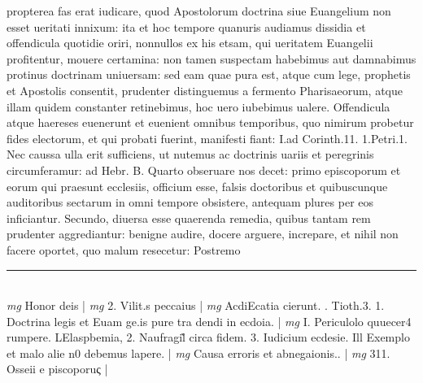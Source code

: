 \documentclass{article}
\begin{document}
\begin{pages}
propterea fas erat iudicare, quod Apostolorum doctrina siue Euangelium non esset ueritati innixum: ita et hoc tempore quanuris audiamus dissidia et offendicula quotidie oriri, nonnullos ex his etsam, qui ueritatem Euangelii profitentur, mouere certamina: non tamen suspectam habebimus aut damnabimus protinus doctrinam uniuersam: sed eam quae pura est, atque cum lege, prophetis et Apostolis consentit, prudenter distinguemus a fermento Pharisaeorum, atque illam quidem constanter retinebimus, hoc uero iubebimus ualere. Offendicula atque  haereses euenerunt et euenient omnibus  temporibus, quo nimirum probetur fides electorum, et qui probati fuerint, manifesti fiant: I.ad Corinth.11. 1.Petri.1. Nec caussa ulla erit sufficiens, ut nutemus ac doctrinis uariis et peregrinis circumferamur: ad Hebr. B. Quarto obseruare nos decet: primo episcoporum et eorum qui praesunt ecclesiis, officium esse, falsis doctoribus et quibuscunque  auditoribus sectarum in omni tempore obsistere, antequam plures per eos inficiantur. Secundo, diuersa esse quaerenda remedia, quibus tantam rem prudenter aggrediantur: benigne audire, docere arguere, increpare, et nihil non facere oportet, quo malum resecetur: Postremo  \pend
\vspace{0.5cm}\noindent
\vspace{0.2cm}\rule{1cm}{0.2pt}\\ 
\hspace{0.2cm}\textit{mg}
\footnotesize Honor deis 
\normalsize| 
\hspace{0.2cm}\textit{mg}
\footnotesize 2. Vilit.s peccaius 
\normalsize| 
\hspace{0.2cm}\textit{mg}
\footnotesize AcdiEcatia cierunt. . Tioth.3. 1. Doctrina legis et Euam ge.is pure tra dendi in ecdoia. 
\normalsize| 
\hspace{0.2cm}\textit{mg}
\footnotesize I. Periculolo quuecer4 rumpere. LElaspbemia, 2. Naufragil̃ circa fidem. 3. Iudicium ecdesie. Ill Exemplo et malo alie n0 debemus lapere. 
\normalsize| 
\hspace{0.2cm}\textit{mg}
\footnotesize Causa erroris et abnegaionis.. 
\normalsize| 
\hspace{0.2cm}\textit{mg}
\footnotesize 311. Osseii e piscoporuς 
\normalsize| 

\end{pages}
\end{document}
